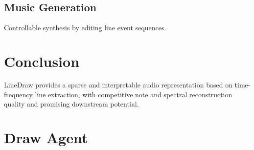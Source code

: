 \documentclass[11pt]{article}
\begin{document}
\subsection{Music Generation}
Controllable synthesis by editing line event sequences.

\section{Conclusion}
LineDraw provides a sparse and interpretable audio representation based on time-frequency line extraction, with competitive note and spectral reconstruction quality and promising downstream potential.

\section{Draw Agent}






\end{document}
